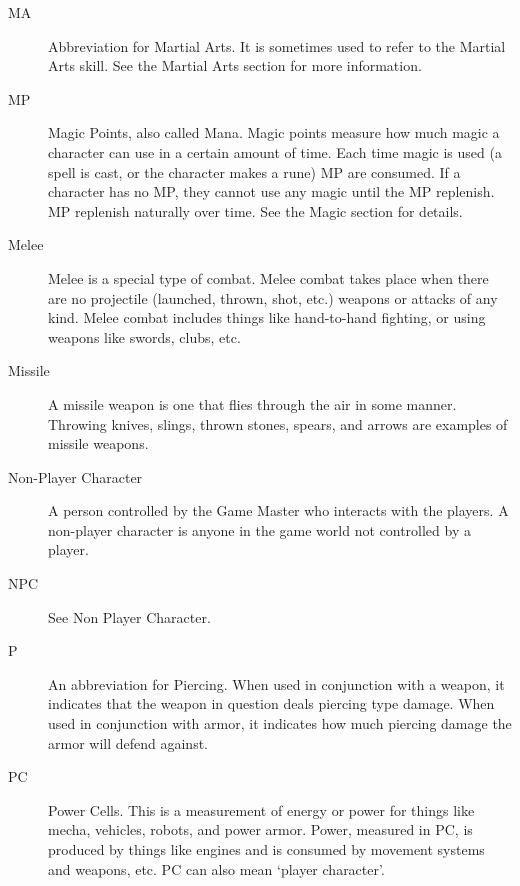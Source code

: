 \documentclass[twoside]{book}
\begin{document}
\begin{description}
  \item[ MA ]   Abbreviation for Martial Arts. It is sometimes
                 used to refer to the Martial Arts skill. See the Martial
                 Arts section for more information. 
  \item[ MP ]   Magic Points, also called Mana. Magic points
                 measure how much magic a character can use in a certain
                 amount of time. Each time magic is used (a spell is
                 cast, or the character makes a rune) MP are consumed. If
                 a character has no MP, they cannot use any magic until
                 the MP replenish. MP replenish naturally over time. See
                 the Magic section for details. 
  \item[ Melee ]   Melee is a special type of combat. Melee combat
                 takes place when there are no projectile (launched,
                 thrown, shot, etc.) weapons or attacks of any kind.
                 Melee combat includes things like hand-to-hand fighting,
                 or using weapons like swords, clubs, etc. 
  \item[ Missile ]   A missile weapon is one that flies through the
                 air in some manner. Throwing knives, slings, thrown
                 stones, spears, and arrows are examples of missile
                 weapons. 
  \item[ Non-Player Character ]   A person controlled by the Game Master who
                 interacts with the players. A non-player character is
                 anyone in the game world not controlled by a player.
                 
  \item[ NPC ]   See Non Player Character. 
  \item[ P ]   An abbreviation for Piercing. When used in
                 conjunction with a weapon, it indicates that the weapon
                 in question deals piercing type damage. When used in
                 conjunction with armor, it indicates how much piercing
                 damage the armor will defend against. 
  \item[ PC ]   Power Cells. This is a measurement of energy or
                 power for things like mecha, vehicles, robots, and power
                 armor. Power, measured in PC, is produced by things like
                 engines and is consumed by movement systems and weapons,
                 etc. PC can also mean `player character'.
                 

\end{description}
\end{document}
